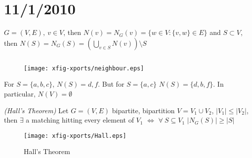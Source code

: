 \documentclass{article}
\begin{document}

\section*{11/1/2010}

\begin{rec}
$G=(V,E),~v \in V$, then $N(v)=N_G(v)=\{w \in V: \{v,w\}\in E\}$ and $S\subset V$, then $N(S) = N_G(S)=(\displaystyle\bigcup_{v \in S} N(v))\setminus S$
\end{rec}

\begin{examp}
$ $
\begin{figure}[H]
\centering
\texttt{[image: xfig-xports/neighbour.eps]}
\end{figure}
For $S= \{a,b,c\}$, $N(S)=d,f$. But for $S = \{a,c\}$ $N(S)=\{d,b,f\}$.  In particular, $N(V) = \emptyset$
\end{examp}


\begin{thm}
\emph{(Hall's Theorem)} Let $G=(V,E)$ bipartite, bipartition $V=V_1\cup V_2$, $|V_1| \leq |V_2|$, then $\exists$ a matching hitting every element of $V_1$ $\iff$  $\forall ~S \subseteq V_1$ $|N_G(S)|\geq |S|$
\end{thm}
\begin{figure}[H]
\centering
\caption{Hall's Theorem}
\texttt{[image: xfig-xports/Hall.eps]}
\end{figure}
\end{document}
